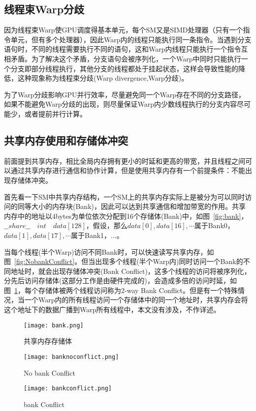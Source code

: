 \subsection{线程束Warp分歧}

因为线程束Warp使GPU调度得基本单元，每个SM又是SIMD处理器（只有一个指令单元，但有多个处理器），因此Warp内的线程只能执行同一条指令。当遇到分支语句时，不同的线程需要执行不同的语句，这和Warp内线程只能执行一个指令互相矛盾。为了解决这个矛盾，分支语句会被序列化，一个Warp中同时只能执行一个分支即部分线程执行，其他分支的线程都处于挂起状态，这样会导致性能的降低，这种现象称为线程束分歧(Warp divergence,Warp分歧)。

为了Warp分歧影响GPU并行效率，尽量避免同一个Warp存在不同的分支路径，如果不能避免Warp分歧的出现，则尽量保证Warp内少数线程执行的分支内容尽可能少，或者提前并行计算。

\subsection{共享内存使用和存储体冲突}
\label{cha:chap02:bankconflict}

前面提到共享内存，相比全局内存拥有更小的时延和更高的带宽，并且线程之间可以通过共享内存进行通信和协作计算，但是使用共享内存有一个前提条件：不能出现存储体冲突。

首先看一下SM中共享内存结构，一个SM上的共享内存实际上是被分为可以同时访问的同等大小的内存块(Bank)，因此可以达到共享通信和增加带宽的作用。共享内存中的地址以4bytes为单位依次分配到16个存储体(Bank)中，如图~\ref{fig:bank}，$\_\_share\_\_\quad int\quad data[128]$，假设，那么$data[0],data[16],\cdots$属于Bank0，$data[1],data[17],\cdots$属于Bank1，...。

当每个线程(半个Warp)访问不同Bank时，可以快速读写共享内存，如图~\ref{fig:NobankConflict}。但当出现多个线程(半个Warp内)同时访问一个Bank的不同地址时，就会出现存储体冲突(Bank Conflict)，这多个线程的访问将被序列化，分先后访问存储体(这部分工作是由硬件完成的)，会造成多倍的访问时延，如图~\ref{fig:bankConflict}，每个存储体被两个线程访问称为2-way Bank Conflict。但是有一个特殊情况，当一个Warp内的所有线程访问一个存储体中的同一个地址时，共享内存会将这个地址下的数据广播到Warp所有线程中，本文没有涉及，不作详述。

\begin{figure}
	\begin{minipage}{0.3\textwidth}
		\centering
		\texttt{[image: bank.png]}
		\caption{共享内存存储体}
		\label{fig:bank}
	\end{minipage}
	\hfill
	\begin{minipage}{0.30\textwidth}
		\centering
		\texttt{[image: banknoconflict.png]}
		\caption{No bank Conflict}
		\label{fig:NobankConflict}
	\end{minipage}
	\hfill
	\begin{minipage}{0.30\textwidth}
		\centering
		\texttt{[image: bankconflict.png]}
		\caption{bank Conflict}
		\label{fig:bankConflict}
	\end{minipage}
\end{figure}

